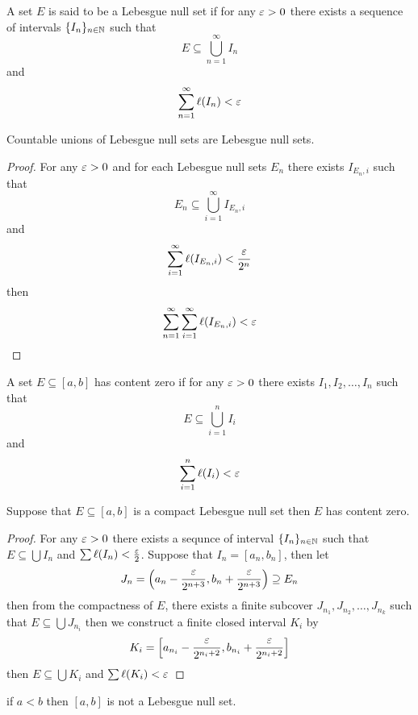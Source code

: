 \begin{definition}
  A set $E$ is said to be a Lebesgue null set if for any $\varepsilon > 0$ there exists a sequence of intervals $\{I_n\}_{n\in\mathbb N}$ such that
  \[E \subseteq \bigcup_{n=1}^{\infty}I_n\]
  and
  \[\sum_{n=1}^{\infty}\ell(I_n) < \varepsilon\]
\end{definition}

\begin{lemma}
  Countable unions of Lebesgue null sets are Lebesgue null sets.
\end{lemma}

\begin{proof}
  For any $\varepsilon > 0$ and for each Lebesgue null sets $E_n$ there exists $I_{E_n, i}$ such that 
  \[E_n \subseteq \bigcup_{i=1}^{\infty}I_{E_n, i}\] and \[ \sum_{i=1}^{\infty}\ell(I_{E_n, i}) < \frac{\varepsilon}{2^n}\]
  then
  \[ \sum_{n=1}^{\infty}\sum_{i=1}^{\infty}\ell(I_{E_n, i}) < \varepsilon\]
\end{proof}

\begin{definition}
  A set $E\subseteq [a, b]$ has content zero if for any $\varepsilon > 0$ there exists $I_1, I_2, \ldots, I_n$ such that
  \[E \subseteq \bigcup_{i=1}^{n}I_i\]
  and
  \[\sum_{i=1}^{n}\ell(I_i) < \varepsilon\] 
\end{definition}

\begin{lemma}
  Suppose that $E \subseteq [a, b]$ is a compact Lebesgue null set then $E$ has content zero.
\end{lemma}

\begin{proof}
  For any $\varepsilon > 0$ there exists a sequnce of interval 
  $\{I_n\}_{n \in \mathbb N}$ such that $E\subseteq \bigcup I_n$ and $\sum \ell(I_n) < \frac{\varepsilon}2$.
  Suppose that $I_n = [a_n, b_n]$, then let $$J_n = \left(a_n - \frac{\varepsilon}{2^{n+3}}, b_n + \frac{\varepsilon}{2^{n+3}}\right) \supseteq E_n$$ then
  from the compactness of $E$, there exists a finite subcover $J_{n_1}, J_{n_2}, \dotsc, J_{n_k}$ such that $E \subseteq \bigcup J_{n_i}$ 
  then we construct a finite closed interval $K_i$ by 
  $$K_i = \left[a_{n_i} - \frac{\varepsilon}{2^{n_i+2}}, b_{n_i} + \frac{\varepsilon}{2^{n_i+2}}\right]$$ then
  $E \subseteq \bigcup K_i$ and $\sum \ell(K_i) < \varepsilon$
\end{proof}

\begin{corollary}
  if $a < b$ then $[a, b]$ is not a Lebesgue null set.
\end{corollary}


